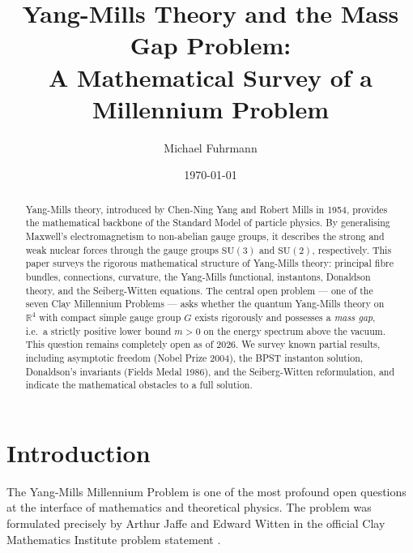 \documentclass[12pt,a4paper]{amsart}
\theoremstyle{definition}
\theoremstyle{remark}
\begin{document}
\title{Yang-Mills Theory and the Mass Gap Problem:\\
A Mathematical Survey of a Millennium Problem}

\author{Michael Fuhrmann}
\address{Specialist Mathematics Project, Build 146}
\date{\today}

\begin{abstract}
Yang-Mills theory, introduced by Chen-Ning Yang and Robert Mills in 1954, provides the
mathematical backbone of the Standard Model of particle physics. By generalising Maxwell's
electromagnetism to non-abelian gauge groups, it describes the strong and weak nuclear
forces through the gauge groups $\mathrm{SU}(3)$ and $\mathrm{SU}(2)$, respectively.
This paper surveys the rigorous mathematical structure of Yang-Mills theory: principal
fibre bundles, connections, curvature, the Yang-Mills functional, instantons, Donaldson
theory, and the Seiberg-Witten equations. The central open problem — one of the seven
Clay Millennium Problems — asks whether the quantum Yang-Mills theory on $\mathbb{R}^4$
with compact simple gauge group $G$ exists rigorously and possesses a \emph{mass gap},
i.e.\ a strictly positive lower bound $m > 0$ on the energy spectrum above the vacuum.
This question remains completely open as of 2026. We survey known partial results,
including asymptotic freedom (Nobel Prize 2004), the BPST instanton solution, Donaldson's
invariants (Fields Medal 1986), and the Seiberg-Witten reformulation, and indicate the
mathematical obstacles to a full solution.
\end{abstract}

\maketitle

\tableofcontents

\section{Introduction}

The Yang-Mills Millennium Problem is one of the most profound open questions at the
interface of mathematics and theoretical physics. The problem was formulated precisely
by Arthur Jaffe and Edward Witten in the official Clay Mathematics Institute problem
statement \cite{JaffeWitten2000}.
\end{document}
